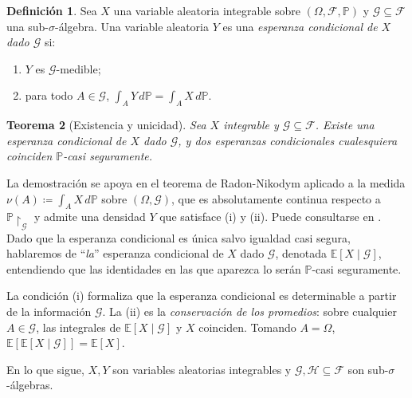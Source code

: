 \documentclass[11pt,a4paper,oneside]{report}
\theoremstyle{plain}
\newtheorem{teorema}{Teorema}[chapter]
\theoremstyle{definition}
\newtheorem{definicion}[teorema]{Definición}
\theoremstyle{remark}
\newcommand{\E}{\mathbb{E}}
\newcommand{\PP}{\mathbb{P}}
\newcommand{\F}{\mathcal{F}}
\newcommand{\G}{\mathcal{G}}
\newcommand{\HH}{\mathcal{H}}
\newcommand{\1}{\mathbf{1}}
\newcommand{\eqdef}{\coloneqq}
\begin{document}
\begin{definicion}
\label{def:esperanza_condicional}
Sea $X$ una variable aleatoria integrable sobre $(\Omega, \F, \PP)$ y
$\G \subseteq \F$ una sub-$\sigma$-álgebra. Una variable aleatoria $Y$
es una \emph{esperanza condicional de $X$ dado $\G$} si:
\begin{enumerate}[label=\textnormal{(\roman*)}]
  \item $Y$ es $\G$-medible;
  \item para todo $A \in \G$, $\displaystyle \int_A Y \, d\PP = \int_A X \, d\PP$.
\end{enumerate}
\end{definicion}

\begin{teorema}[Existencia y unicidad]
\label{teo:existencia_esperanza_condicional}
Sea $X$ integrable y $\G \subseteq \F$. Existe una esperanza condicional
de $X$ dado $\G$, y dos esperanzas condicionales cualesquiera coinciden
$\PP$-casi seguramente.
\end{teorema}

La demostración se apoya en el teorema de Radon-Nikodym aplicado a la
medida $\nu(A) \eqdef \int_A X \, d\PP$ sobre $(\Omega, \G)$, que es
absolutamente continua respecto a $\PP\!\restriction_\G$ y admite una
densidad $Y$ que satisface (i) y (ii). Puede consultarse en
\cite{williams}. Dado que la esperanza condicional es única salvo
igualdad casi segura, hablaremos de ``\emph{la}'' esperanza condicional
de $X$ dado $\G$, denotada $\E[X \mid \G]$, entendiendo que las
identidades en las que aparezca lo serán $\PP$-casi seguramente.

La condición (i) formaliza que la esperanza condicional es determinable
a partir de la información $\G$. La (ii) es la \emph{conservación de
los promedios}: sobre cualquier $A \in \G$, las integrales de $\E[X
\mid \G]$ y $X$ coinciden. Tomando $A = \Omega$, $\E[\E[X \mid \G]] =
\E[X]$.

En lo que sigue, $X, Y$
son variables aleatorias integrables y $\G, \HH \subseteq \F$ son
sub-$\sigma$-álgebras.
\end{document}
